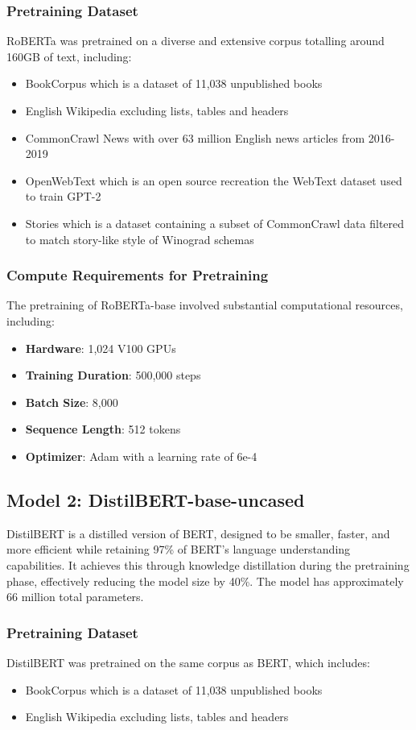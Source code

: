 \documentclass[titlepage]{article}
\begin{document}
\subsubsection{Pretraining Dataset}
RoBERTa was pretrained on a diverse and extensive corpus totalling around 160GB of text, including:
\begin{itemize}
    \item BookCorpus which is a dataset of 11,038 unpublished books 
    \item English Wikipedia excluding lists, tables and headers 
    \item CommonCrawl News with over 63 million English news articles from 2016-2019 
    \item OpenWebText which is an open source recreation the WebText dataset used to train GPT-2 
    \item Stories which is a dataset containing a subset of CommonCrawl data filtered to match story-like style of Winograd schemas
\end{itemize}

\subsubsection{Compute Requirements for Pretraining}
The pretraining of RoBERTa-base involved substantial computational resources, including:
\begin{itemize}
    \item \textbf{Hardware}: 1,024 V100 GPUs
    \item \textbf{Training Duration}: 500,000 steps 
    \item \textbf{Batch Size}: 8,000
    \item \textbf{Sequence Length}: 512 tokens
    \item \textbf{Optimizer}: Adam with a learning rate of 6e-4 
\end{itemize}

\subsection{Model 2: DistilBERT-base-uncased}
DistilBERT is a distilled version of BERT, designed to be smaller, faster, and more efficient while retaining 97\% of BERT's language 
understanding capabilities. It achieves this through knowledge distillation during the pretraining phase, effectively reducing the model 
size by 40\%. The model has approximately 66 million total parameters.

\subsubsection{Pretraining Dataset}
DistilBERT was pretrained on the same corpus as BERT, which includes:
\begin{itemize}
    \item BookCorpus which is a dataset of 11,038 unpublished books
    \item English Wikipedia excluding lists, tables and headers
\end{itemize}
\end{document}
